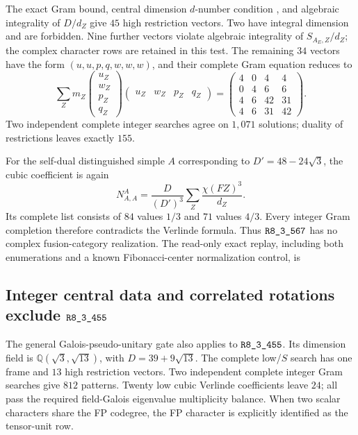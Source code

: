 The exact Gram bound, central dimension $d$-number condition
\cite[Theorem~1.8]{OstrikCode}, and algebraic integrality of $D/d_Z$
\cite[Proposition~3.3]{ENO} give $45$ high restriction vectors.
Two have integral dimension and are forbidden.  Nine further vectors
violate algebraic integrality of $S_{A_E,Z}/d_Z$; the complex character
rows are retained in this test.  The remaining $34$ vectors have the
form $(u,u,p,q,w,w,w)$, and their complete Gram equation reduces to
\[
\sum_Z m_Z
\begin{pmatrix}u_Z\\w_Z\\p_Z\\q_Z\end{pmatrix}
\begin{pmatrix}u_Z&w_Z&p_Z&q_Z\end{pmatrix}
=
\begin{pmatrix}
4&0&4&4\\0&4&6&6\\4&6&42&31\\4&6&31&42
\end{pmatrix}.
\]
Two independent complete integer searches agree on $1{,}071$ solutions;
duality of restrictions leaves exactly $155$.

For the self-dual distinguished simple $A$ corresponding to
$D'=48-24\sqrt3$, the cubic coefficient is again
\[
 N_{A,A}^{A}=\frac{D}{(D')^3}\sum_Z\frac{\chi(FZ)^3}{d_Z}.
\]
Its complete list consists of $84$ values $1/3$ and $71$ values $4/3$.
Every integer Gram completion therefore contradicts the Verlinde
formula.  Thus $\sha{R8_3_567}$ has no complex fusion-category realization.
The read-only exact replay, including both enumerations and a known
Fibonacci-center normalization control, is
\begin{quote}\footnotesize{}\end{quote}

\subsection{Integer central data and correlated rotations exclude \texorpdfstring{$\sha{R8_3_455}$}{R8,3,455}}
\label{subsec:r455-integer-rotation}

The general Galois-pseudo-unitary gate also applies to $\sha{R8_3_455}$.
Its dimension field is $\mathbb Q(\sqrt3,\sqrt{13})$, with
$D=39+9\sqrt{13}$.  The complete low/$S$ search has one frame and
$13$ high restriction vectors.  Two independent complete integer Gram
searches give $812$ patterns.  Twenty low cubic Verlinde coefficients
leave $24$; all pass the required field-Galois eigenvalue multiplicity
balance.  When two scalar characters share the FP codegree, the FP
character is explicitly identified as the tensor-unit row.

